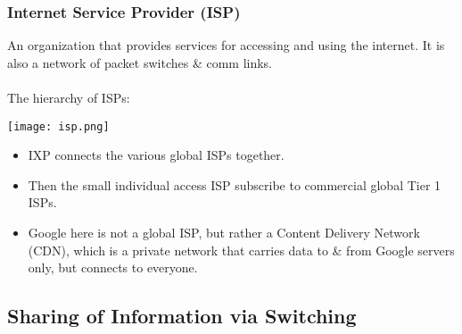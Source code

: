 \documentclass[a4paper]{article}
\begin{document}
\subsubsection{Internet Service Provider (ISP)}
An organization that provides services for accessing and using the internet. It is also a network of packet switches \& comm links.\\
\\
The hierarchy of ISPs: 
\begin{center}
	\texttt{[image: isp.png]}
\end{center}
\begin{itemize}
	\item IXP connects the various global ISPs together.
	\item Then the small individual access ISP subscribe to commercial global Tier 1 ISPs.
	\item Google here is not a global ISP, but rather a Content Delivery Network (CDN), which is a private network that carries data to \& from Google servers only, but connects to everyone.
\end{itemize}
\newpage
\subsection{Sharing of Information via Switching}
\end{document}
